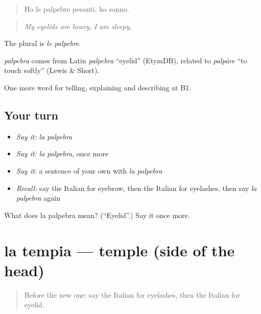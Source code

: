\begin{quote}
Ho le palpebre pesanti, ho sonno.
\end{quote}

\begin{quote}
\emph{My eyelids are heavy, I am sleepy.}
\end{quote}

The plural is \emph{le palpebre}.

\begin{cousinweb}
\emph{palpebra} comes from Latin \emph{palpebra} \textquotedblleft{}eyelid\textquotedblright{} (EtymDB), related to \emph{palpāre} \textquotedblleft{}to touch softly\textquotedblright{} (Lewis \& Short).
\end{cousinweb}

\begin{grammarlens}[title={What you've built}]
One more word for telling, explaining and describing at B1.
\end{grammarlens}

\subsection*{Your turn}
\begin{itemize}
\raggedright
  \item \emph{Say it:} \emph{la palpebra}
  \item \emph{Say it:} \emph{la palpebra}, once more
  \item \emph{Say it:} a sentence of your own with \emph{la palpebra}
  \item \emph{Recall:} say the Italian for eyebrow, then the Italian for eyelashes, then say \emph{la palpebra} again
\end{itemize}

\begin{tcolorbox}[breakable,colback=teal!4,colframe=teal!35!black,title={Before you move on}]
What does la palpebra mean? (\textquotedblleft{}Eyelid\textquotedblright{}.) Say it once more.
\end{tcolorbox}
\section[la tempia]{la tempia — temple (side of the head)}

\label{lesson:IT-C482-tempia}



\begin{quote}
Before the new one: say the Italian for eyelashes, then the Italian for eyelid.
\end{quote}

